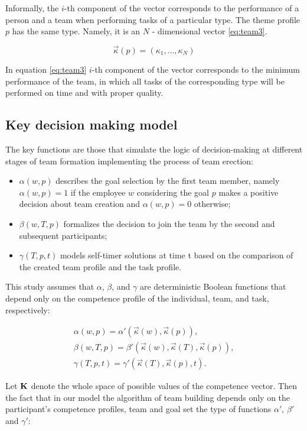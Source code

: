 \documentclass[12pt]{report}
\theoremstyle{definition}
\begin{document}
Informally, the $i$-th component of the vector corresponds to the performance of a person and a team when performing tasks of a particular type.
The theme profile $p$ has the same type. Namely, it is an $N$ - dimensional vector \ref{eq:team3}.

\begin{equation}\label{eq:team3}
\vec{\kappa} \left( p \right) = \left( \kappa_1, \ldots, \kappa_N \right)
\end{equation}

In equation  \ref{eq:team3}  $i$-th component of the vector corresponds to the minimum performance of the team, in which all tasks of the corresponding type will be performed on time and with proper quality.

\subsection{Key decision making model}

The key functions are those that simulate the logic of decision-making at different stages of team formation implementing the process of team erection:
\begin{itemize}
	\item
	$\alpha(w, p) $ describes the goal selection by the first team member, namely $\alpha(w, p)=1$ if the employee $w$ considering the goal $p$ makes a positive decision about team creation and $\alpha(w, p)=0$ otherwise; 
	\item 
	$\beta (w, T, p)$ formalizes the decision to join the team by the second and subsequent participants;
	\item 
	$\gamma (T, p, t)$ models self-timer solutions at time t based on the comparison of the created team profile and the task profile. 
\end{itemize}

This study assumes that $\alpha$, $\beta$, and $\gamma$ are deterministic Boolean functions that depend only on the competence profile of the individual, team, and task, respectively:

\begin{eqnarray} \label{eq:team4}
	\alpha(w, p) = \alpha'(\vec{\kappa}(w), \vec{\kappa}(p)),\\
	\beta(w, T, p) = \beta'(\vec{\kappa}(w), \vec{\kappa}(T), \vec{\kappa}(p)),\\
	\gamma(T, p, t) = \gamma'(\vec{\kappa}(T), \vec{\kappa}(p), t).
\end{eqnarray}

Let $\bf K$ denote the whole space of possible values of the competence vector. 
Then the fact that in our model the algorithm of team building depends only on the participant's competence profiles, team and goal set the type of functions $\alpha'$, $\beta'$ and $\gamma'$:
\end{document}
